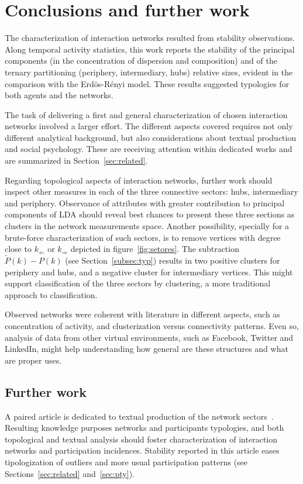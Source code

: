 \documentclass[%
 aip,
 jmp,%
 amsmath,amssymb,
 reprint,%
]{revtex4-1}
\begin{document}
 
\section{Conclusions and further work}\label{sec:conc}
The characterization of interaction networks resulted from stability observations. Along temporal activity statistics, this work reports the stability of the principal components (in the concentration of dispersion and composition) and of the ternary partitioning (periphery, intermediary, hubs) relative sizes, evident in the comparison with the Erd\"os-R\'enyi model. These results suggested typologies for both agents and the networks.

The task of delivering a first and general characterization of chosen interaction networks involved a larger effort. The different aspects covered requires not only different analytical background, but also considerations about textual production and social psychology. These are receiving attention within dedicated works and are summarized in Section~\ref{sec:related}.

Regarding topological aspects of interaction networks, further work should inspect other measures in each of the three connective sectors: hubs, intermediary and periphery.
Observance of attributes with greater contribution to principal components of LDA should reveal best chances to present these three sections as clusters in the network measurements space. Another possibility, specially for a brute-force characterization of such sectors, is to remove vertices with degree close to $k_\Leftarrow$ or $k_\Rightarrow$ depicted in figure~\ref{fig:setores}. The subtraction $\widetilde{P}(k)-P(k)$ (see Section~\ref{subsec:typ}) results in two positive clusters for periphery and hubs, and a negative cluster for intermediary vertices. This might support classification of the three sectors by clustering, a more traditional approach to classification.

Observed networks were coherent with literature in different aspects, such as concentration of activity, and clusterization versus connectivity patterns. Even so, analysis of data from other virtual environments, such as Facebook, Twitter and LinkedIn, might help understanding how general are these structures and what are proper uses.


\subsection{Further work}\label{sec:further}
A paired article is dedicated to textual production of the network sectors~\cite{rcText}. Resulting knowledge purposes networks and participants typologies, and both topological and textual analysis should foster characterization of interaction networks and participation incidences.
Stability reported in this article eases tipologization of outliers and more usual participation patterns (see Sections~\ref{sec:related} and~\ref{sec:pty}).
\end{document}

